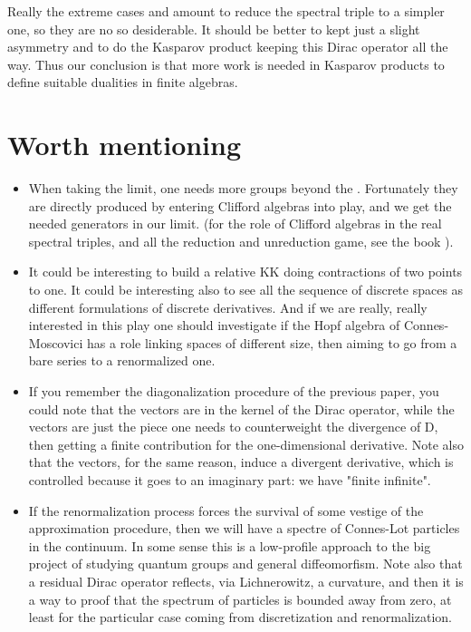 \documentclass[a4paper,10pt]{article}
\begin{document}
Really the extreme cases \coordHE{} and \coordHE{} amount to reduce the spectral
triple to a simpler one, so they are no so desiderable. It should be better
to kept just a slight asymmetry and to do the Kasparov product keeping
this Dirac operator all the way. Thus our conclusion is that more work
is needed in Kasparov products to define suitable dualities in 
finite algebras.

\section{Worth mentioning}

\begin{itemize}
\item
When taking the \coordHE{} limit, one needs more groups beyond the
\coordHE{}. Fortunately they are directly produced by entering Clifford
algebras into play, and we get the needed generators in our limit.
(for the role of Clifford algebras in the real spectral triples, and all
the reduction and unreduction game, see the book \cite{FGV}).

\item
It could be interesting to build a relative KK doing contractions of two
points to one. It could be interesting also to see all the sequence of
discrete spaces as different formulations of discrete derivatives. And if
we are really, really interested in this play one should investigate if
the Hopf algebra of Connes-Moscovici has a role linking spaces of
different size, then aiming to go from a bare series to a renormalized one.

\item
If you remember the diagonalization procedure of the previous paper,
you could note that the vectors \coordHE{} are in the kernel of the
Dirac operator, while
the vectors \coordHE{} are just the piece one needs to counterweight the
\coordHE{} divergence of D, then getting a finite contribution
for the one-dimensional derivative. Note also that the \coordHE{} vectors, for
the same reason, induce a divergent derivative, which is controlled because it
goes to an imaginary part: we have  "finite \coordHE{} infinite".

\item
If the renormalization process forces the survival of some vestige of the
approximation procedure, then we will have a spectre of Connes-Lot particles
in the continuum. In some  sense this is a low-profile approach to the big 
project of studying quantum groups and general diffeomorfism. Note also
that a residual Dirac operator reflects, via Lichnerowitz, a curvature, and
then it is a way to proof that the spectrum of particles is bounded away
from zero, at least for the particular case coming from discretization
and renormalization. 


\end{itemize}
\end{document}
